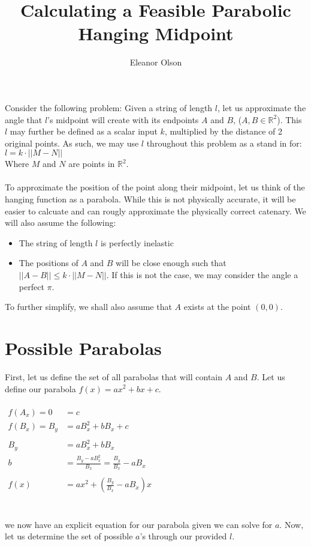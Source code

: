 \documentclass[11pt]{article}
\author{Eleanor Olson}
\title{Calculating a Feasible Parabolic Hanging Midpoint}
\begin{document}
\maketitle
Consider the following problem: Given a string of length $l$, let us approximate the angle that $l$'s midpoint will create with its endpoints $A$ and $B$, ($A, B \in \mathbb{R}^2$). This $l$ may further be defined as a scalar input $k$, multiplied by the distance of 2 original points. As such, we may use $l$ throughout this problem as a stand in for:\\
\indent $l=k\cdot ||M-N||$\\
Where $M$ and $N$ are points in $\mathbb{R}^2$.\\\\
To approximate the position of the point along their midpoint, let us think of the hanging function as a parabola. While this is not physically accurate, it will be easier to calcuate and can rougly approximate the physically correct catenary. We will also assume the following:
\indent\begin{itemize}
\item The string of length $l$ is perfectly inelastic
\item The positions of $A$ and $B$ will be close enough such that $||A-B|| \leq k\cdot ||M-N||$. If this is not the case, we may consider the angle a perfect $\pi$.
\end{itemize}
To further simplify, we shall also assume that $A$ exists at the point $(0,0)$.
\newpage
\section{Possible Parabolas}
First, let us define the set of all parabolas that will contain $A$ and $B$. Let us define our parabola $f(x) = ax^2+bx+c$.\\\\
$\begin{aligned}
f(A_x) = 0 &= c\\
f(B_x) = B_y &= aB_x^2+bB_x+c\\\\
B_y &= aB_x^2+bB_x\\
b &= \frac{B_y-aB_x^2}{B_x} = \frac{B_y}{B_x}-aB_x\\\\
f(x) &= ax^2+\left(\frac{B_y}{B_x}-aB_x\right)x
\end{aligned}$\\\\\\
we now have an explicit equation for our parabola given we can solve for $a$. Now, let us determine the set of possible $a$'s through our provided $l$.
\newpage
\end{document}
